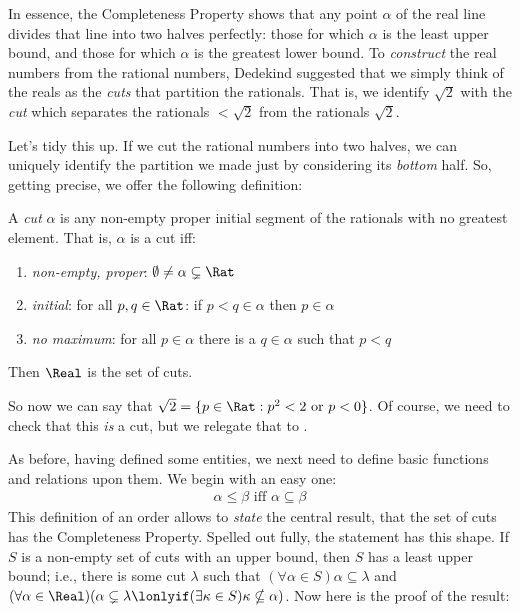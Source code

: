 \documentclass[../../../include/open-logic-section]{subfiles}
\begin{document}

In essence, the Completeness Property shows that any point $\alpha$ of
the real line divides that line into two halves perfectly: those for
which $\alpha$ is the least upper bound, and those for which $\alpha$
is the greatest lower bound. To \emph{construct} the real numbers from
the rational numbers, Dedekind suggested that we simply think of the
reals as the \emph{cuts} that partition the rationals. That is, we
identify $\sqrt{2}$ with the \emph{cut} which separates the rationals
$< \sqrt{2}$ from the rationals $ \sqrt{2}$. 

Let's tidy this up. If we cut the rational numbers into two halves, we
can uniquely identify the partition we made just by considering its
\emph{bottom} half. So, getting precise, we offer the following
definition:

\begin{defn}[Cut] 
A \emph{cut} $\alpha$ is any non-empty proper
initial segment of the rationals with no greatest element. That is,
$\alpha$ is a cut iff:
\begin{enumerate}
	\item \emph{non-empty, proper}: $\emptyset \neq \alpha \subsetneq \Rat$
	\item \emph{initial}: for all $p,q \in \Rat$: if $p < q \in \alpha$ then $p \in \alpha$
	\item \emph{no maximum}: for all $p \in \alpha$ there is a $q \in \alpha$ such that $p < q$ 
\end{enumerate} 
Then $\Real$ is the set of cuts. 
\end{defn}

So now we can say that $\sqrt{2} = \Setabs{p \in \Rat}{p^2 < 2\text{
or }p < 0}$. Of course, we need to check that this \emph{is} a cut,
but we relegate that to .

As before, having defined some entities, we next need to define basic
functions and relations upon them. We begin with an easy one:
\begin{align*}
	\alpha \leq \beta \text{ iff }\alpha \subseteq \beta
\end{align*}
This definition of an order allows to \emph{state} the central result,
that the set of cuts has the Completeness Property. Spelled out fully,
the statement has this shape. If $S$ is a non-empty set of cuts with
an upper bound, then $S$ has a least upper bound; i.e., there is some
cut $\lambda$ such that $(\forall \alpha \in S)\alpha \subseteq
\lambda$ and $(\forall \alpha \in \Real)(\alpha \subsetneq \lambda
\lonlyif (\exists \kappa \in S)\kappa \nsubseteq \alpha)$. Now here is
the proof of the result:
\end{document}
